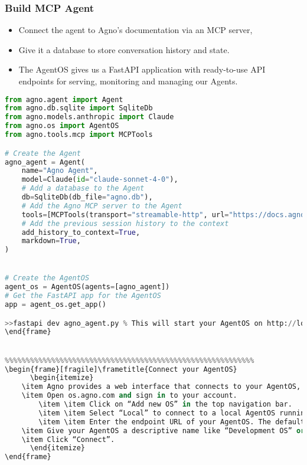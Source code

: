 \begin{frame}[fragile]\frametitle{Build MCP Agent}
      \begin{itemize}
	\item Connect the agent to Agno’s documentation via an MCP server, 
	\item Give it a database to store conversation history and state.
	\item The AgentOS gives us a FastAPI application with ready-to-use API endpoints for serving, monitoring and managing our Agents.
	  \end{itemize}
      
      \begin{lstlisting}[language=python, basicstyle=\tiny]
from agno.agent import Agent
from agno.db.sqlite import SqliteDb
from agno.models.anthropic import Claude
from agno.os import AgentOS
from agno.tools.mcp import MCPTools

# Create the Agent
agno_agent = Agent(
    name="Agno Agent",
    model=Claude(id="claude-sonnet-4-0"),
    # Add a database to the Agent
    db=SqliteDb(db_file="agno.db"),
    # Add the Agno MCP server to the Agent
    tools=[MCPTools(transport="streamable-http", url="https://docs.agno.com/mcp")],
    # Add the previous session history to the context
    add_history_to_context=True,
    markdown=True,
)


# Create the AgentOS
agent_os = AgentOS(agents=[agno_agent])
# Get the FastAPI app for the AgentOS
app = agent_os.get_app()

>>fastapi dev agno_agent.py % This will start your AgentOS on http://localhost:8000
\end{frame}


%%%%%%%%%%%%%%%%%%%%%%%%%%%%%%%%%%%%%%%%%%%%%%%%%%%%%%%%%%%
\begin{frame}[fragile]\frametitle{Connect your AgentOS}
      \begin{itemize}
	\item Agno provides a web interface that connects to your AgentOS, use it to monitor, manage and test your agentic system. 
	\item Open os.agno.com and sign in to your account.
		\item \item Click on “Add new OS” in the top navigation bar.
		\item \item Select “Local” to connect to a local AgentOS running on your machine.
		\item \item Enter the endpoint URL of your AgentOS. The default is http://	\item localhost:8000.
	\item Give your AgentOS a descriptive name like “Development OS” or “Local 8000”.
	\item Click “Connect”.
	  \end{itemize}
\end{frame}



\end{lstlisting}
\end{frame}
